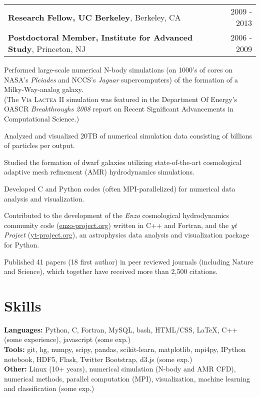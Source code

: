 \begin{resume}
\hspace*{-0.1in}
\begin{tabularx}{1.025\textwidth}{Xr}
\textbf{Research Fellow, UC Berkeley}, Berkeley, CA & 2009 - 2013 \\
\textbf{Postdoctoral Member, Institute for Advanced Study}, Princeton, NJ & 2006 - 2009 \\
\end{tabularx}
\vspace*{0.025in}
\begin{list1}
\item Performed large-scale numerical N-body simulations (on 1000's of cores on NASA's \textit{Pleiades} and NCCS's \textit{Jaguar} supercomputers) of the formation of a Milky-Way-analog galaxy. \\
(The \textsc{Via Lactea II} simulation was featured in the Department Of Energy's OASCR \textit{Breakthroughs 2008} report on Recent Significant Advancements in Computational Science.)
\item Analyzed and visualized 20TB of numerical simulation data consisting of billions of particles per output.
\item Studied the formation of dwarf galaxies utilizing state-of-the-art cosmological adaptive mesh refinement (AMR) hydrodynamics simulations.
\item Developed C and Python codes (often MPI-parallelized) for numerical data analysis and visualization.
\item Contributed to the development of the \textit{Enzo} cosmological hydrodynamics community code (\url{enzo-project.org}) written in C++ and Fortran, and the \textit{yt Project} (\url{yt-project.org}), an astrophysics data analysis and visualization package for Python.
\item Published 41 papers (18 first author) in peer reviewed journals (including Nature and Science), which together have received more than 2,500 citations.
\end{list1}

\section{\sc Skills}
\textbf{Languages:} Python, C, Fortran, MySQL, bash, HTML/CSS, \LaTeX, C++ (some experience), javascript (some exp.) \vspace{0.05in} \\
\textbf{Tools:} git, hg, numpy, scipy, pandas, scikit-learn, matplotlib, mpi4py, IPython notebook, HDF5, Flask, Twitter Bootstrap, d3.js (some exp.) \vspace{0.05in} \\
\textbf{Other:} Linux (10+ years), numerical simulation (N-body and AMR CFD), numerical methods, parallel computation (MPI), visualization, machine learning and classification (some exp.) 


\end{resume}
